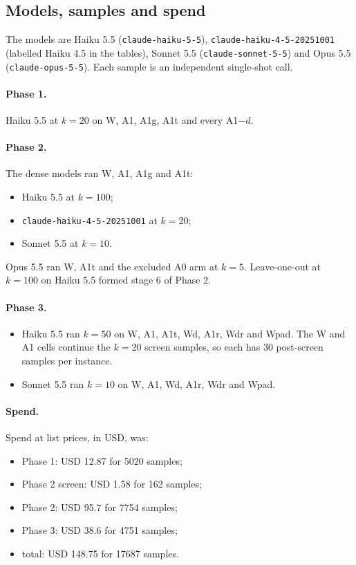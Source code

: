 \subsection{Models, samples and spend}

The models are Haiku 5.5 (\texttt{claude-haiku-5-5}), \texttt{claude-haiku-4-5-20251001} (labelled Haiku 4.5 in the tables), Sonnet 5.5 (\texttt{claude-sonnet-5-5}) and Opus 5.5 (\texttt{claude-opus-5-5}). Each sample is an independent single-shot call.

\paragraph{Phase 1.} Haiku 5.5 at $k=20$ on W, A1, A1g, A1t and every A1$-d$.

\paragraph{Phase 2.} The dense models ran W, A1, A1g and A1t:
\begin{itemize}
\item Haiku 5.5 at $k=100$;
\item \texttt{claude-haiku-4-5-20251001} at $k=20$;
\item Sonnet 5.5 at $k=10$.
\end{itemize}
Opus 5.5 ran W, A1t and the excluded A0 arm at $k=5$. Leave-one-out at $k=100$ on Haiku 5.5 formed stage 6 of Phase 2.

\paragraph{Phase 3.}
\begin{itemize}
\item Haiku 5.5 ran $k=50$ on W, A1, A1t, Wd, A1r, Wdr and Wpad. The W and A1 cells continue the $k=20$ screen samples, so each has 30 post-screen samples per instance.
\item Sonnet 5.5 ran $k=10$ on W, A1, Wd, A1r, Wdr and Wpad.
\end{itemize}

\paragraph{Spend.} Spend at list prices, in USD, was:
\begin{itemize}
\item Phase 1: USD 12.87 for 5020 samples;
\item Phase 2 screen: USD 1.58 for 162 samples;
\item Phase 2: USD 95.7 for 7754 samples;
\item Phase 3: USD 38.6 for 4751 samples;
\item total: USD 148.75 for 17687 samples.
\end{itemize}

